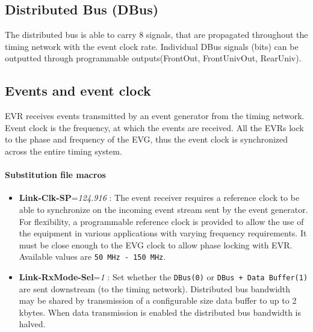 \documentclass[12pt,a4paper]{article}
\begin{document}
\subsection{Distributed Bus (DBus)}\label{sec:DBus}
The distributed bus is able to carry 8 signals, that are propagated throughout the timing network with the event clock rate. Individual DBus signals (bits) can be outputted through programmable outputs(FrontOut, FrontUnivOut, RearUniv). 

\subsection{Events and event clock}\label{sec:Events and event clock}
EVR receives events transmitted by an event generator from the timing network. Event clock is the frequency, at which the events are received. All the EVRs lock to the phase and frequency of the EVG, thus the event clock is synchronized across the entire timing system.

\paragraph{Substitution file macros}
\begin{itemize}
\item
	\textbf{Link-Clk-SP}=\emph{124.916} : The event receiver requires a
reference clock to be able to synchronize on the incoming event
stream sent by the event generator. For flexibility, a programmable
reference clock is provided to allow the use of the equipment in
various applications with varying frequency requirements. It must be
close enough to the EVG clock to allow phase locking with
EVR. Available values are \texttt{50 MHz - 150 MHz}. 
\item
\textbf{Link-RxMode-Sel}=\emph{1} : Set whether the \texttt{DBus(0)} or
\texttt{DBus + Data Buffer(1)} are sent downstream (to the timing network). Distributed bus bandwidth may be shared by transmission of a configurable size data buffer to up to 2 kbytes. When data transmission is enabled the distributed bus bandwidth is halved. 
\end{itemize}
\end{document}
